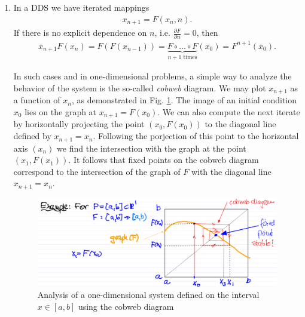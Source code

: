 \begin{enumerate}
	\item In a DDS we have iterated mappings 
	\begin{align}
		\boxed{ {x}_{n+1} = F( {x}_n , n).}	
	\end{align}
	If there is no explicit dependence on $n$, i.e. $\frac{\partial F}{\partial n} = 0$, then 
	\begin{align}
		\boxed{  {x}_{n+1} F( {x}_n) = F(F( {x}_{n-1})) = \underbrace{F \circ \ldots \circ F}_{n+1 \textrm{ times} }( {x}_0) = F^{n+1}( {x}_0).}
	\end{align}
\begin{ex}
	In such cases and in one-dimensional problems, a simple way to analyze the behavior of the system is the so-called \textit{cobweb} diagram. We may plot $x_{n+1}$ as a function of $x_{n}$, as demonstrated in Fig. \ref{fig:cobweb}. The image of an initial condition $x_0$ lies on the graph at $x_{n+1}=F(x_0)$. We can also compute the next iterate by horizontally projecting the point $(x_0, F(x_0))$ to the diagonal line defined by $x_{n+1}= x_n$. Following the porjection of this point to the horizontal axis $(x_n)$ we find the intersection with the graph at the point $(x_1, F(x_1))$. It follows that fixed points on the cobweb diagram correspond to the intersection of the graph of $F$ with the diagonal line $x_{n+1}= x_n$.
	\begin{figure}[h!]
	\centering
	\includegraphics[width = \textwidth]{figures/intro/1DDS.png}
	\caption{Analysis of a one-dimensional system defined on the interval $x\in [a,b]$ using the cobweb diagram} \label{fig:cobweb}
\end{figure}
\end{ex}


\end{enumerate}
